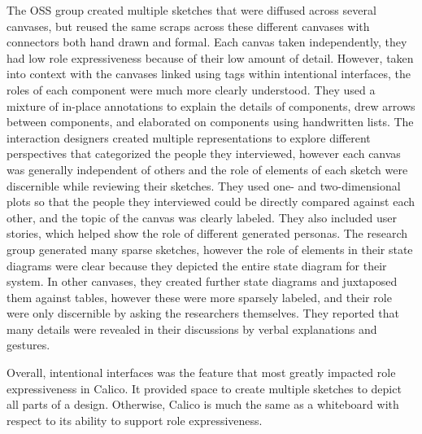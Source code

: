 The OSS group created multiple sketches that were diffused across several canvases, but reused the same scraps across these different canvases with connectors both hand drawn and formal. Each canvas taken independently, they had low role expressiveness because of their low amount of detail. However, taken into context with the canvases linked using tags within intentional interfaces, the roles of each component were much more clearly understood. They used a mixture of in-place annotations to explain the details of components, drew arrows between components, and elaborated on components using handwritten lists. The interaction designers created multiple representations to explore different perspectives that categorized the people they interviewed, however each canvas was generally independent of others and the role of elements of each sketch were discernible while reviewing their sketches. They used one- and two-dimensional plots so that the people they interviewed could be directly compared against each other, and the topic of the canvas was clearly labeled. They also included user stories, which helped show the role of different generated personas. The research group generated many sparse sketches, however the role of elements in their state diagrams were clear because they depicted the entire state diagram for their system. In other canvases, they created further state diagrams and juxtaposed them against tables, however these were more sparsely labeled, and their role were only discernible by asking the researchers themselves. They reported that many details were revealed in their discussions by verbal explanations and gestures.

Overall, intentional interfaces was the feature that most greatly impacted role expressiveness in Calico. It provided space to create multiple sketches to depict all parts of a design. Otherwise, Calico is much the same as a whiteboard with respect to its ability to support role expressiveness.

%

